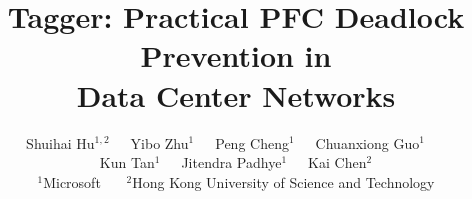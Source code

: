 \documentclass[10pt, sigconf, printonly]{acmart}
\newcommand{\sysname}{Tagger}
\begin{document}
	\title{\sysname{}: Practical PFC Deadlock Prevention in\\Data Center Networks}
	\author{Shuihai Hu$^{1,2}$~~~Yibo Zhu$^{1}$~~~Peng Cheng$^{1}$~~~Chuanxiong Guo$^{1}$~~~\\Kun Tan$^{1}$~~~Jitendra Padhye$^{1}$~~~Kai Chen$^{2}$\\ 
		$^{1}$Microsoft ~~~$^{2}$Hong Kong University of Science and Technology}


	\maketitle
	
	
	
	
	
	
	
	
	
	
	
	
%	
	
	
	
	
\end{document}
